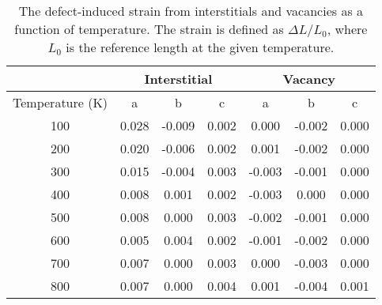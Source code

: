 \documentclass[utf8]{frontiersSCNS} %
\begin{document}
\begin{table}[h]
\caption{The defect-induced strain from interstitials and vacancies as a function of temperature. The strain is defined as $\Delta L/L_0$, where $L_0$ is the reference length at the given temperature. } \label{tab:strain}
\begin{center}
\begin{tabular}{|c|c|c|c|c|c|c|}
	\hline
	& \multicolumn{3}{c|}{Interstitial} & \multicolumn{3}{c|}{Vacancy} \\
	 \hline
Temperature (K)  &	a	& b	& c & a & b & c \\
\hline
100	&0.028	&-0.009	&0.002&		0.000	&-0.002	&0.000 \\
200	&0.020	&-0.006	&0.002&		0.001	&-0.002	&0.000 \\
300	&0.015	&-0.004	&0.003&		-0.003	&-0.001	&0.000 \\
400	&0.008	&0.001	&0.002&		-0.003	&0.000	&0.000 \\
500	&0.008	&0.000	&0.003&		-0.002	&-0.001	&0.000 \\
600	&0.005	&0.004	&0.002&		-0.001	&-0.002	&0.000 \\
700	&0.007	&0.000	&0.003&		0.000	&-0.003	&0.000 \\
800	&0.007	&0.000	&0.004&		0.001	&-0.004	&0.001 \\
	 \hline
\end{tabular}
\end{center}
\label{default}
\end{table}

\FloatBarrier

 

\end{document}
